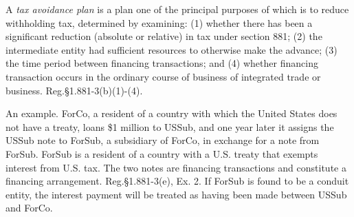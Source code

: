 A \emph{tax avoidance plan} is a plan one of the principal purposes of which is to reduce withholding tax, determined by examining: (1) whether there has been a significant reduction (absolute or relative) in tax under section 881; (2) the intermediate entity had sufficient resources to otherwise make the advance; (3) the time period between financing transactions; and (4) whether financing transaction occurs in the ordinary course of business of integrated trade or business. Reg.\@ \S1.881-3(b)(1)-(4).

An example.  ForCo, a resident of a country with which the United States does not have a treaty, loans \$1 million to USSub, and one year later it assigns the USSub note to ForSub, a subsidiary of ForCo, in exchange for a note from ForSub.  ForSub is a resident of a country with a U.S. treaty that exempts interest from U.S. tax.  The two notes are financing transactions and constitute a financing arrangement. Reg.\@ \S1.881-3(e), Ex. 2.  If ForSub is found to be a conduit entity, the interest payment will be treated as having been made between USSub and ForCo. 

